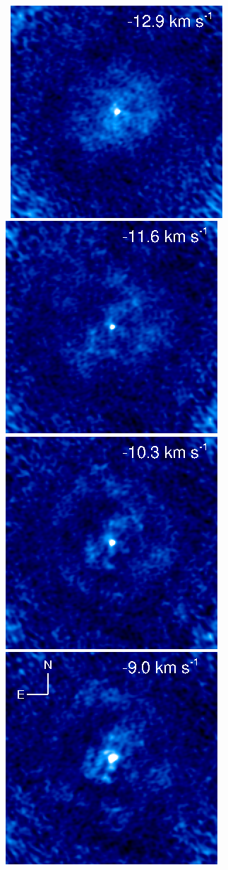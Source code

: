 \documentclass[preprint2]{aastex}
\begin{document}
\begin{figure}[hbt!]
{          }
\\
\mbox{
          \includegraphics[]{chan37.ps}
          \includegraphics[]{chan36.ps}
          \includegraphics[]{chan35.ps}
          \includegraphics[]{chan34.ps}
}
\end{figure}
\end{document}
